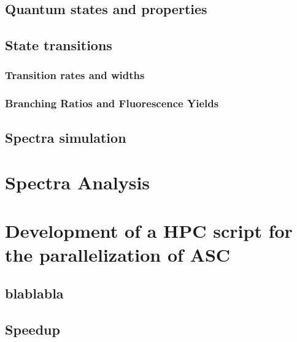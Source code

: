 
\section{Quantum states and properties}

\section{State transitions}

\subsection{Transition rates and widths}
\subsection{Branching Ratios and Fluorescence Yields}

\section{Spectra simulation}

\chapter{Spectra Analysis}

\chapter{Development of a \gls{HPC} script for the parallelization of \gls{ASC}}

\section{blablabla}

\section{Speedup}

